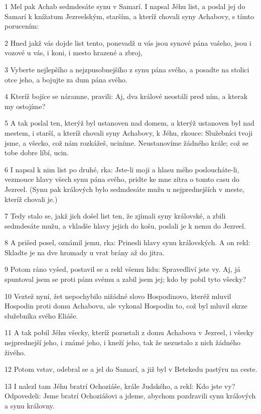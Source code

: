 \par 1 Mel pak Achab sedmdesáte synu v Samarí. I napsal Jéhu list, a poslal jej do Samarí k knížatum Jezreelským, starším, a kteríž chovali syny Achabovy, s tímto porucením:
\par 2 Hned jakž vás dojde list tento, ponevadž u vás jsou synové pána vašeho, jsou i vozové u vás, i koni, i mesto hrazené a zbroj,
\par 3 Vyberte nejlepšího a nejzpusobnejšího z synu pána svého, a posadte na stolici otce jeho, a bojujte za dum pána svého.
\par 4 Kteríž bojíce se náramne, pravili: Aj, dva králové neostáli pred ním, a kterak my ostojíme?
\par 5 A tak poslal ten, kterýž byl ustanoven nad domem, a kterýž ustanoven byl nad mestem, i starší, a kteríž chovali syny Achabovy, k Jéhu, rkouce: Služebníci tvoji jsme, a všecko, což nám rozkážeš, uciníme. Neustanovíme žádného krále; což se tobe dobre líbí, ucin.
\par 6 I napsal k nim list po druhé, rka: Jste-li moji a hlasu mého posloucháte-li, vezmouce hlavy všech synu pána svého, pridte ke mne zítra o tomto casu do Jezreel. (Synu pak králových bylo sedmdesáte mužu u nejprednejších v meste, kteríž chovali je.)
\par 7 Tedy stalo se, jakž jich došel list ten, že zjímali syny královské, a zbili sedmdesáte mužu, a vkladše hlavy jejich do košu, poslali je k nemu do Jezreel.
\par 8 A prišed posel, oznámil jemu, rka: Prinesli hlavy synu královských. A on rekl: Skladte je na dve hromady u vrat brány až do jitra.
\par 9 Potom ráno vyšed, postavil se a rekl všemu lidu: Spravedliví jste vy. Aj, já spuntoval jsem se proti pánu svému a zabil jsem jej; kdo by pobil tyto všecky?
\par 10 Veztež nyní, žet nepochybilo nižádné slovo Hospodinovo, kteréž mluvil Hospodin proti domu Achabovu, ale vykonal Hospodin to, což byl mluvil skrze služebníka svého Eliáše.
\par 11 A tak pobil Jéhu všecky, kteríž pozustali z domu Achabova v Jezreel, i všecky nejprednejší jeho, i známé jeho, i kneží jeho, tak že nezustalo z nich žádného živého.
\par 12 Potom vstav, odebral se a jel do Samarí, a již byl v Betekedu pastýru na ceste.
\par 13 I nalezl tam Jéhu bratrí Ochoziáše, krále Judského, a rekl: Kdo jste vy? Odpovedeli: Jsme bratrí Ochoziášovi a jdeme, abychom pozdravili synu králových a synu královny.
